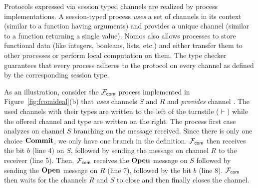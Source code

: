 

Protocols expressed via session typed channels are realized by process implementations.
A session-typed process \emph{uses} a set of channels in its context (similar to a function
having arguments) and provides a unique channel (similar to a function returning a single value).
Nomos also allows processes to store functional data (like integers, booleans, lists, etc.)
and either transfer them to other processes or perform local computation on them.
The type checker guarantees that every process adheres to the protocol on every channel as defined by
the corresponding session type.


As an illustration, consider the $\mathcal{F}_{{\mathsf {com}}}$ process implemented in Figure~\ref{fig:fcomideal}(b)
that \emph{uses} channels $S$ and $R$ and \emph{provides} channel .
The used channels with their types are written to the left of the turnstile
($\vdash$) while the offered channel and type are written on the right.
The process first case analyzes on channel $S$ branching on the
message received.
Since there is only one choice $\mathbf{Commit}$, we only have one
branch in the definition.
$\mathcal{F}_{{\mathsf {com}}}$ then receives the bit $b$ (line 4) on $S$, followed by sending the
 message on channel $R$ to the receiver (line 5).
Then, $\mathcal{F}_{{\mathsf {com}}}$ receives the $\mathbf{Open}$ message on $S$ followed by sending the
$\mathbf{Open}$ message on $R$ (line 7), followed by the bit $b$ (line 8).
$\mathcal{F}_{{\mathsf {com}}}$ then waits for the channels $R$ and $S$ to close and then finally
closes the  channel.



%

